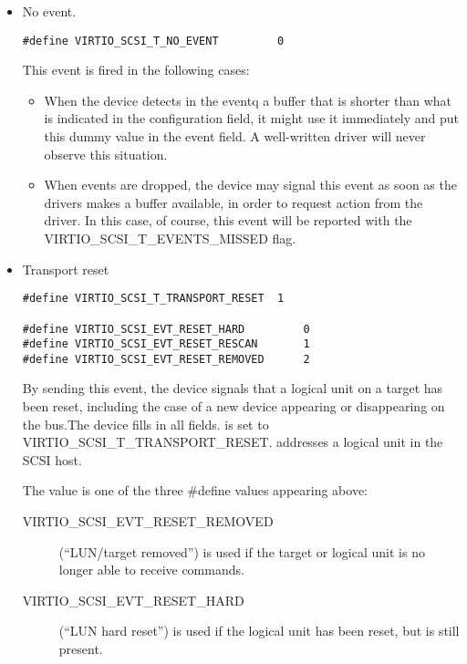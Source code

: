 \begin{itemize}
\item No event.
\begin{lstlisting}
#define VIRTIO_SCSI_T_NO_EVENT         0
\end{lstlisting}

  This event is fired in the following cases:

\begin{itemize}
\item When the device detects in the eventq a buffer that is
    shorter than what is indicated in the configuration field, it
    might use it immediately and put this dummy value in the
    event field. A well-written driver will never observe this
    situation.

\item When events are dropped, the device may signal this event as
    soon as the drivers makes a buffer available, in order to
    request action from the driver. In this case, of course, this
    event will be reported with the VIRTIO_SCSI_T_EVENTS_MISSED
    flag.
\end{itemize}

\item Transport reset
\begin{lstlisting}
#define VIRTIO_SCSI_T_TRANSPORT_RESET  1

#define VIRTIO_SCSI_EVT_RESET_HARD         0
#define VIRTIO_SCSI_EVT_RESET_RESCAN       1
#define VIRTIO_SCSI_EVT_RESET_REMOVED      2
\end{lstlisting}

  By sending this event, the device signals that a logical unit
  on a target has been reset, including the case of a new device
  appearing or disappearing on the bus.The device fills in all
  fields.  is set to
  VIRTIO_SCSI_T_TRANSPORT_RESET.  addresses a
  logical unit in the SCSI host.

  The  value is one of the three \#define values appearing
  above:

  \begin{description}
  \item[VIRTIO_SCSI_EVT_RESET_REMOVED] (“LUN/target removed”) is used
    if the target or logical unit is no longer able to receive
    commands.

  \item[VIRTIO_SCSI_EVT_RESET_HARD] (“LUN hard reset”) is used if the
    logical unit has been reset, but is still present.


\end{description}
\end{itemize}
